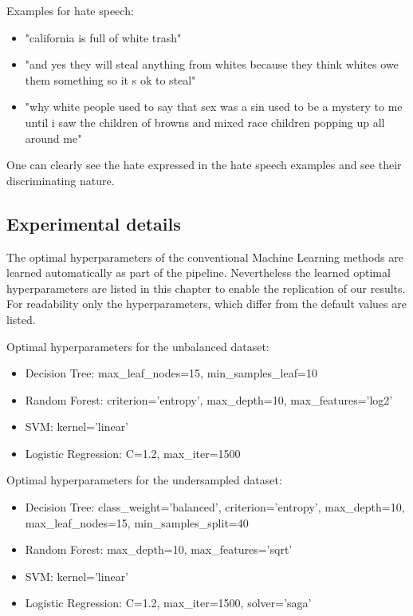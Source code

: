\noindent
Examples for hate speech:
\begin{itemize}
    \item "california is full of white trash"
    \item "and yes they will steal anything from whites because they think whites owe them something so it s ok to steal"
    \item "why white people used to say that sex was a sin used to be a mystery to me until i saw the children of browns and mixed race children popping up all around me"
\end{itemize}

One can clearly see the hate expressed in the hate speech examples and see their discriminating nature.

\subsection{Experimental details}


The optimal hyperparameters of the conventional Machine Learning methods are learned automatically as part of the pipeline. Nevertheless the learned optimal hyperparameters are listed in this chapter to enable the replication of our results. For readability only the hyperparameters, which differ from the default values are listed.

Optimal hyperparameters for the unbalanced dataset:
\begin{itemize}
	\item Decision Tree: max\_leaf\_nodes=15, min\_samples\_leaf=10
	\item Random Forest: criterion='entropy', max\_depth=10, max\_features='log2'
	\item SVM: kernel='linear'
	\item Logistic Regression: C=1.2, max\_iter=1500
\end{itemize}

Optimal hyperparameters for the undersampled dataset:
\begin{itemize}
	\item Decision Tree: class\_weight='balanced', criterion='entropy', max\_depth=10, max\_leaf\_nodes=15, min\_samples\_split=40
	\item Random Forest: max\_depth=10, max\_features='sqrt'
	\item SVM: kernel='linear'
	\item Logistic Regression: C=1.2, max\_iter=1500, solver='saga'
\end{itemize}

